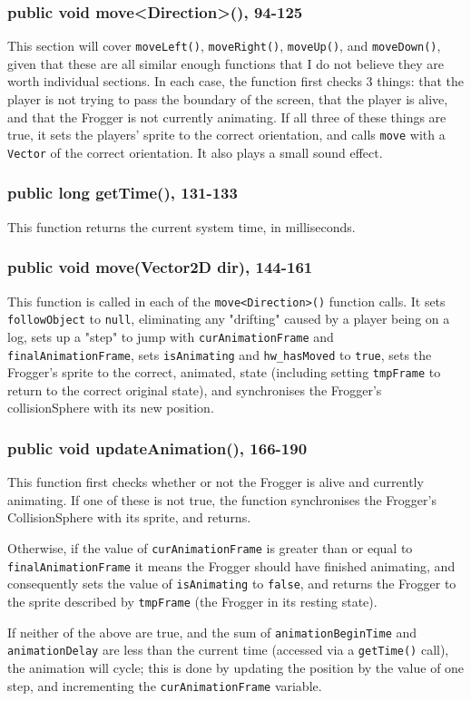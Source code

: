 \documentclass[12pt]{article}
\begin{document}
\subsubsection{public void move<Direction>(), 94-125}
This section will cover \verb|moveLeft()|, \verb|moveRight()|, \verb|moveUp()|, and \verb|moveDown()|, given that these are all similar enough functions that I do not believe they are worth individual sections.
In each case, the function first checks 3 things: that the player is not trying to pass the boundary of the screen, that the player is alive, and that the Frogger is not currently animating.
If all three of these things are true, it sets the players' sprite to the correct orientation, and calls \verb|move| with a \verb|Vector| of the correct orientation.
It also plays a small sound effect.

\subsubsection{public long getTime(), 131-133}
This function returns the current system time, in milliseconds.

\subsubsection{public void move(Vector2D dir), 144-161}
This function is called in each of the \verb|move<Direction>()| function calls.
It sets \verb|followObject| to \verb|null|, eliminating any "drifting" caused by a player being on a log, sets up a "step" to jump with \verb|curAnimationFrame| and \verb|finalAnimationFrame|, sets \verb|isAnimating| and \verb|hw_hasMoved| to \verb|true|, sets the Frogger's sprite to the correct, animated, state (including setting \verb|tmpFrame| to return to the correct original state), and synchronises the Frogger's collisionSphere with its new position.

\subsubsection{public void updateAnimation(), 166-190}
This function first checks whether or not the Frogger is alive and currently animating.
If one of these is not true, the function synchronises the Frogger's CollisionSphere with its sprite, and returns.
\par
Otherwise, if the value of \verb|curAnimationFrame| is greater than or equal to \verb|finalAnimationFrame| it means the Frogger should have finished animating, and consequently sets the value of \verb|isAnimating| to \verb|false|, and returns the Frogger to the sprite described by \verb|tmpFrame| (the Frogger in its resting state).
\par
If neither of the above are true, and the sum of \verb|animationBeginTime| and \verb|animationDelay| are less than the current time (accessed via a \verb|getTime()| call), the animation will cycle; this is done by updating the position by the value of one step, and incrementing the \verb|curAnimationFrame| variable.
\end{document}
